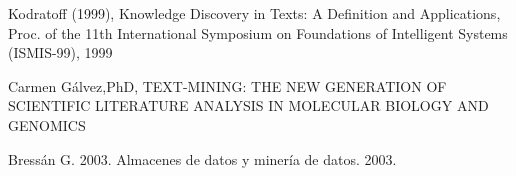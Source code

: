 \begin{thebibliography}{99}
 Kodratoff (1999), Knowledge Discovery in Texts: A Definition and Applications, Proc. of the 11th International Symposium on Foundations of Intelligent Systems (ISMIS-99), 1999

 Carmen G\'alvez,PhD, TEXT-MINING: THE NEW GENERATION OF SCIENTIFIC LITERATURE ANALYSIS IN MOLECULAR BIOLOGY AND GENOMICS

  Bress\'an G. 2003. Almacenes de datos y miner\'ia de datos. 2003.

\end{thebibliography}

